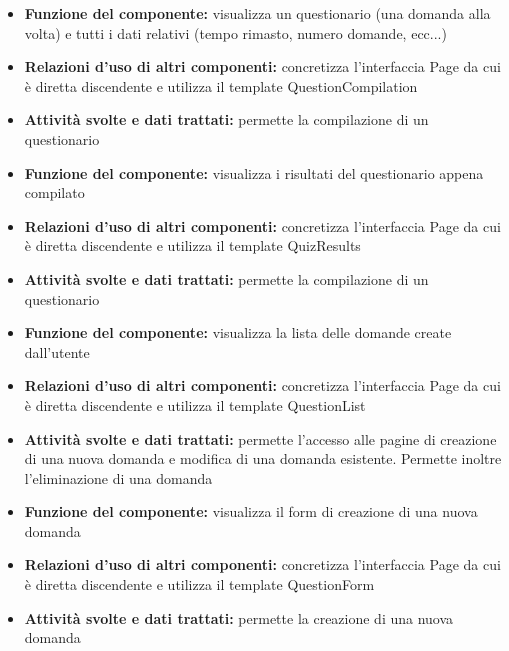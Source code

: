 			\begin{itemize}
		    		\item\textbf{Funzione del componente:} visualizza un questionario (una domanda alla volta) e tutti i dati relativi (tempo rimasto, numero domande, ecc...)
				\item\textbf{Relazioni d'uso di altri componenti:} concretizza l'interfaccia Page da cui è diretta discendente e utilizza il template QuestionCompilation
				\item\textbf{Attività svolte e dati trattati:} permette la compilazione di un questionario
			\end{itemize}
			\begin{itemize}
		    		\item\textbf{Funzione del componente:} visualizza i risultati del questionario appena compilato
				\item\textbf{Relazioni d'uso di altri componenti:} concretizza l'interfaccia Page da cui è diretta discendente e utilizza il template QuizResults
				\item\textbf{Attività svolte e dati trattati:} permette la compilazione di un questionario
			\end{itemize}
			\begin{itemize}
		    		\item\textbf{Funzione del componente:} visualizza la lista delle domande create dall'utente
				\item\textbf{Relazioni d'uso di altri componenti:} concretizza l'interfaccia Page da cui è diretta discendente e utilizza il template QuestionList
				\item\textbf{Attività svolte e dati trattati:} permette l'accesso alle pagine di creazione di una nuova domanda e modifica di una domanda esistente. Permette inoltre l'eliminazione di una domanda
			\end{itemize}
			\begin{itemize}
		    		\item\textbf{Funzione del componente:} visualizza il form di creazione di una nuova domanda
				\item\textbf{Relazioni d'uso di altri componenti:} concretizza l'interfaccia Page da cui è diretta discendente e utilizza il template QuestionForm
				\item\textbf{Attività svolte e dati trattati:} permette la creazione di una nuova domanda
			\end{itemize}
